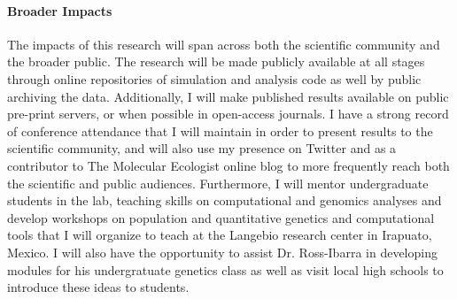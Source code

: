 \vspace{-0.4cm}

\paragraph{Broader Impacts}

The impacts of this research will span across both the scientific community and the broader public. The research will be made publicly available at all stages through online repositories of simulation and analysis code as well by public archiving the data. Additionally, I will make published results available on public pre-print servers, or when possible in open-access journals. I have a strong record of conference attendance that I will maintain in order to present results to the scientific community, and will also use my presence on Twitter and as a contributor to The Molecular Ecologist online blog to more frequently reach both the scientific and public audiences. Furthermore, I will mentor undergraduate students in the lab, teaching skills on computational and genomics analyses and develop workshops on population and quantitative genetics and computational tools that I will organize to teach at the Langebio research center in Irapuato, Mexico. I will also have the opportunity to assist Dr. Ross-Ibarra in developing modules for his undergratuate genetics class as well as visit local high schools to introduce these ideas to students.






